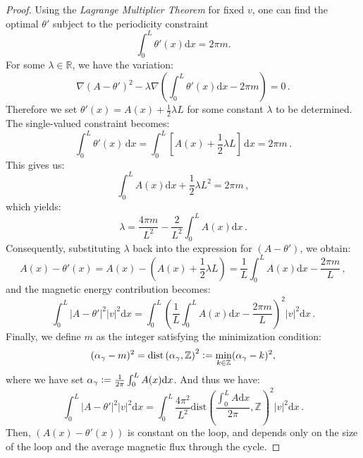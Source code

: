 \documentclass[10pt,a4paper]{amsart}
\newcommand{\defeq}{\vcentcolon=}
\begin{document}
\begin{proof}
Using the \emph{Lagrange Multiplier Theorem} for fixed $v$, one can find the optimal $\theta'$ subject to the periodicity constraint 
\begin{equation}
    \int_0^L \theta'(x) \mathrm{d}x = 2 \pi m.
\end{equation}
For some $\lambda \in \mathbb{R}$, we have the variation:
\begin{equation}
\nabla (A-\theta')^2 - \lambda \nabla\left(\int_0^L \theta'(x) \mathrm{d}x - 2\pi m\right ) = 0\,.
\end{equation}
Therefore we set $\theta'(x) = A(x) + \frac{1}{2}\lambda L$ for some constant $\lambda$ to be determined. The single-valued constraint becomes:
\begin{equation}
\int_0^L \theta'(x)\, \mathrm{d}x = \int_0^L \left[A(x) + \frac{1}{2}\lambda L\right ]\, \mathrm{d}x = 2\pi m\,.
\end{equation}
This gives us:
\begin{equation}
\int_0^L A(x) \mathrm{d}x + \frac{1}{2}\lambda L^2 = 2\pi m\,,
\end{equation}
which yields:
\begin{equation}
\lambda = \frac{4\pi m}{L^2} - \frac{2}{L^2}\int_0^L A(x) \mathrm{d}x \,.
\end{equation}
Consequently, substituting $\lambda$ back into the expression for $(A-\theta')$, we obtain:
\begin{equation}
     A(x) - \theta'(x) = A(x) - \left(A(x) + \frac{1}{2}\lambda L\right) = \frac{1}{L}\int_0^L A(x) \mathrm{d}x - \frac{2\pi m}{L}\,,
\end{equation} 
and the magnetic energy contribution becomes:
\begin{equation}
\int_0^L |A - \theta'|^2|v|^2 \mathrm{d}x =  \int_0^L  \left(\frac{1}{L}\int_0^L A(x) \mathrm{d}x - \frac{2\pi m}{L}\right)^2|v|^2 \mathrm{d}x\,.
\end{equation}
Finally, we define $m$ as the integer satisfying the minimization condition:
$$
(\alpha_\gamma - m)^2 = \mathrm{dist}\left(\alpha_\gamma, \mathbb{Z}\right)^2 \defeq \min_{k \in \mathbb{Z}} (\alpha_\gamma - k)^2,
$$
where we have set $\alpha_\gamma \defeq \frac{1}{2\pi} \int_{0}^L A(x) \mathrm{d} x$.
And thus we have:
\begin{equation}
    \int_0^L \left|A - \theta'\right|^2|v|^2 \mathrm{d}x = \int_0^L \frac{4 \pi^2}{L^2} \mathrm{dist}\left( \frac{\int_0^L A \mathrm{d}x}{2 \pi}, \mathbb{Z} \right)^2 |v|^2 \mathrm{d}x\, .
\end{equation}
Then, $\left(A(x) - \theta'(x)\right)$ is constant on the loop, and depends only on the size of the loop and the average magnetic flux through the cycle. 


\end{proof}
\end{document}

